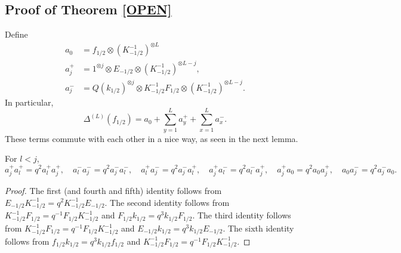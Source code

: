 \documentclass[12pt]{ximera}
\begin{document}
\subsection{Proof of Theorem \ref{OPEN}}

Define 
\begin{align*}
a_0 &= f_{1/2} \otimes (K_{-1/2}^{-1} )^{\otimes L} \\
a_j^+ &= 1^{\otimes j} \otimes E_{-1/2} \otimes (K_{-1/2}^{-1})^{\otimes L-j} ,\\
a_j^- &= Q (k_{1/2})^{\otimes j} \otimes K_{-1/2}^{-1}F_{1/2} \otimes (K_{-1/2}^{-1})^{\otimes L-j}.
\end{align*}
In particular, 
$$
\Delta^{(L)}(f_{1/2}) = a_0 + \sum_{y=1}^L a_y^+ + \sum_{x=1}^L a_x^-.
$$
These terms commute with each other in a nice way, as seen in the next lemma.  
\begin{lemma}
For $l<j$,
$$
a^+_j a^+_l = q^2 a^+_l a^+_j, \quad a^-_l a^-_j = q^2 a^-_j a^-_l, \quad a^+_l a^-_j = q^2 a^-_j a^+_l, \quad a^+_j a^-_l = q^2 a^-_l a^+_j, \quad a_j^+a_0 = q^2 a_0 a_j^+, \quad a_0 a_j^- = q^2 a_j^-a_0.
$$
\end{lemma}
\begin{proof}
The first (and fourth and fifth) identity follows from $E_{-1/2}K_{-1/2}^{-1} = q^2 K_{-1/2}^{-1}E_{-1/2}$. The second identity follows from $K_{-1/2}^{-1}F_{1/2}=q^{-1} F_{1/2}K_{-1/2}^{-1}$ and $F_{1/2}k_{1/2}=q^3k_{1/2}F_{1/2}.$ The third identity follows from $K_{-1/2}^{-1}F_{1/2} = q^{-1}F_{1/2}K_{-1/2}^{-1}$ and $E_{-1/2}k_{1/2}=q^3 k_{1/2}E_{-1/2}$. The sixth identity follows from $f_{1/2}k_{1/2}=q^3k_{1/2}f_{1/2}$ and $K_{-1/2}^{-1}F_{1/2}=q^{-1} F_{1/2}K_{-1/2}^{-1}$.
\end{proof}
\end{document}

